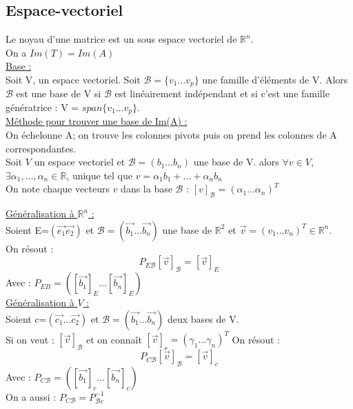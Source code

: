 \documentclass[../main.tex]{subfiles}
\begin{document}
\subsection{Espace-vectoriel}
Le noyau d'une matrice est un sous espace vectoriel de $\mathbb{R}^n$. \\
On a $Im(T) = Im(A)$\\

\quad \underline{Base :}\\
Soit V, un espace vectoriel. Soit $\mathcal{B} = \{v_1 \dots v_p\}$ une famille d'éléments de V. Alors $\mathcal{B}$ est une base de V si $\mathcal{B}$ est linéairement indépendant et si c'est une famille génératrice : V = $span\{v_1 \dots v_p\}$.\\

\quad \underline{Méthode pour trouver une base de Im(A) :}\\
On échelonne A; on trouve les colonnes pivots puis on prend les colonnes de A correspondantes.\\
Soit $V$ un espace vectoriel et $\mathcal{B} = (b_1 \dots b_n) $ une base de V. alors $\forall v \in V$, $\exists \alpha_1, \dots, \alpha_n \in \mathbb{R}$, unique tel que $v = \alpha_1 b_1 + \dots + \alpha_n b_n$\\
On note chaque vecteurs $v$ dans la base $\mathcal{B}$ : $[v]_{\mathcal{B}} = (\alpha_1 \dots \alpha_n)^T$


\quad \underline{Généralisation à $\mathbb{R}^n$ :}\\

Soient E=$(\vec{e_1} \vec{e_2})$ et $\mathcal{B} = (\vec{b_1} \dots \vec{b_n})$ une base de $\mathbb{R}^2$ et $\vec{v} = (v_1 \dots v_n)^T \in \mathbb{R}^n$.\\
On résout :
\begin{equation}
    P_{E\mathcal{B}} [\vec{v}]_{\mathcal{B}} = [\vec{v}]_E
\end{equation}
Avec : $P_{EB} = ([\vec{b_1}]_E \dots [\vec{b_n}]_E)$\\

\quad \underline{Généralisation à $V$ :}\\

Soient c=$(\vec{c_1} \dots \vec{c_2})$ et $\mathcal{B} = (\vec{b_1} \dots \vec{b_n})$ deux bases de V.\\
Si on veut : $[\vec{v}]_{\mathcal{B}}$ et on connaît $[\vec{v}]_{\mathcal{c}} = (\gamma_1 \dots \gamma_n)^T$
On résout :
\begin{equation}
    P_{C\mathcal{B}} [\vec{v}]_{\mathcal{B}} = [\vec{v}]_c
\end{equation}
Avec : $P_{C\mathcal{B}} = ([\vec{b_1}]_c \dots [\vec{b_n}]_c)$\\
On a aussi : $P_{C\mathcal{B}} = P_{\mathcal{B}c}^{-1}$\\
\end{document}
